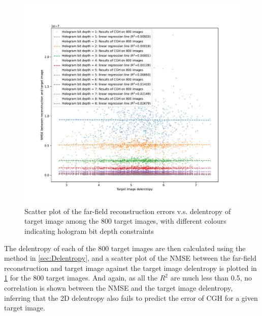 	\begin{figure} [H]
		\begin{center}
		\includegraphics[trim={50 40 70 70}, clip, width = \textwidth]{GS_Fraunhofer_NMSE_VS_Delentropy.pdf}
		\end{center}
		\caption{\label{fig:GS_Fraunhofer_NMSE_VS_Delentropy} Scatter plot of the far-field reconstruction errors v.s. delentropy of target image among the 800 target images, with different colours indicating hologram bit depth constraints}
	\end{figure}

	The delentropy of each of the 800 target images are then calculated using the method in \cref{sec:Delentropy}, and a scatter plot of the NMSE between the far-field reconstruction and target image against the target image delentropy is plotted in \cref{fig:GS_Fraunhofer_NMSE_VS_Delentropy} for the 800 target images. And again, as all the $R^2$ are much less than 0.5, no correlation is shown between the NMSE and the target image delentropy, inferring that the 2D delentropy also fails to predict the error of CGH for a given target image.


